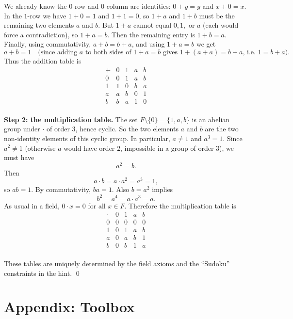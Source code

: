 \documentclass[12pt]{article}
\begin{document}
We already know the $0$-row and $0$-column are identities: $0+y=y$ and $x+0=x$.
In the $1$-row we have $1+0=1$ and $1+1=0$, so $1+a$ and $1+b$ must be the remaining two elements $a$ and $b$.
But $1+a$ cannot equal $0,1,$ or $a$ (each would force a contradiction), so $1+a=b$.
Then the remaining entry is $1+b=a$.
Finally, using commutativity, $a+b=b+a$, and using $1+a=b$ we get
\[
a+b=1 \quad\text{(since adding $a$ to both sides of $1+a=b$ gives $1+(a+a)=b+a$, i.e. $1=b+a$).}
\]
Thus the addition table is
\[
\begin{array}{c|cccc}
  + & 0 & 1 & a & b \\ \hline
  0 & 0 & 1 & a & b \\
  1 & 1 & 0 & b & a \\
  a & a & b & 0 & 1 \\
  b & b & a & 1 & 0 \\
\end{array}
\]

\medskip
\textbf{Step 2: the multiplication table.}
The set $F\setminus\{0\}=\{1,a,b\}$ is an abelian group under $\cdot$ of order $3$, hence cyclic.
So the two elements $a$ and $b$ are the two non-identity elements of this cyclic group.
In particular, $a\neq 1$ and $a^3=1$.
Since $a^2\neq 1$ (otherwise $a$ would have order $2$, impossible in a group of order $3$), we must have
\[
a^2=b.
\]
Then
\[
a\cdot b=a\cdot a^2=a^3=1,
\]
so $ab=1$. By commutativity, $ba=1$.
Also $b=a^2$ implies
\[
b^2=a^4=a\cdot a^3=a.
\]
As usual in a field, $0\cdot x=0$ for all $x\in F$.
Therefore the multiplication table is
\[
\begin{array}{c|cccc}
  \cdot & 0 & 1 & a & b \\ \hline
  0 & 0 & 0 & 0 & 0 \\
  1 & 0 & 1 & a & b \\
  a & 0 & a & b & 1 \\
  b & 0 & b & 1 & a \\
\end{array}
\]

These tables are uniquely determined by the field axioms and the “Sudoku” constraints in the hint.
\qed

\newpage
\appendix
\section*{Appendix: Toolbox}
\end{document}
